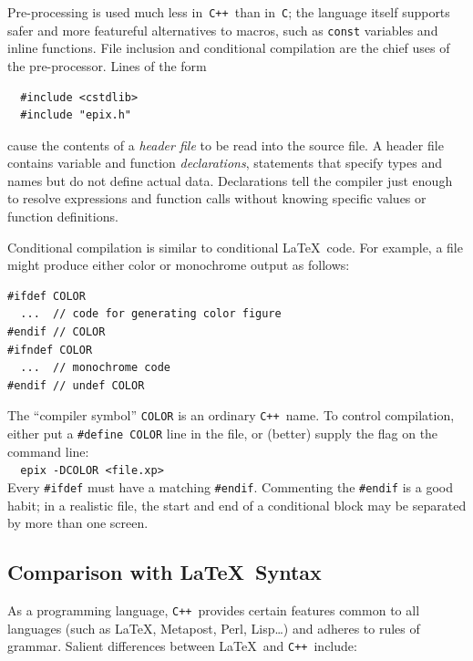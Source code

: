 \documentclass[12pt]{report}
\newcommand{\code}[1]{\texttt{#1}}
\newcommand{\CXX}{\code{C++}}
\begin{document}
Pre-processing is used much less in~\CXX\ than in~\code{C}; the
language itself supports safer and more featureful alternatives to
macros, such as \code{const} variables and inline functions. File
inclusion and conditional compilation are the chief uses of the
pre-processor. Lines of the form 
\begin{verbatim}
  #include <cstdlib>
  #include "epix.h"
\end{verbatim}
cause the contents of a \emph{header file} to be read into the source
file. A header file contains variable and function
\emph{declarations}, statements that specify types and names but do
not define actual data. Declarations tell the compiler just enough
to resolve expressions and function calls without knowing specific
values or function definitions. 

 Conditional compilation is
similar to conditional \LaTeX\ code. For example, a file might produce
either color or monochrome output as follows: 
\begin{verbatim}
#ifdef COLOR
  ...  // code for generating color figure
#endif // COLOR
#ifndef COLOR
  ...  // monochrome code
#endif // undef COLOR
\end{verbatim}
The ``compiler symbol'' \code{COLOR} is an ordinary \CXX\ name. To
control compilation, either put a \code{\#define COLOR} line in the
file, or (better) supply the flag on the command line: \\
\verb+  epix -DCOLOR <file.xp>+ \\
Every \code{\#ifdef} must have a matching \code{\#endif}. Commenting
the \code{\#endif} is a good habit; in a realistic file, the start and
end of a conditional block may be separated by more than one screen.


\subsection*{Comparison with \LaTeX\ Syntax}

As a programming language, \CXX\ provides certain features common to
all languages (such as \LaTeX, Metapost, Perl, Lisp\ldots) and adheres
to rules of grammar. Salient differences between \LaTeX\ and \CXX\ 
include:
\end{document}
